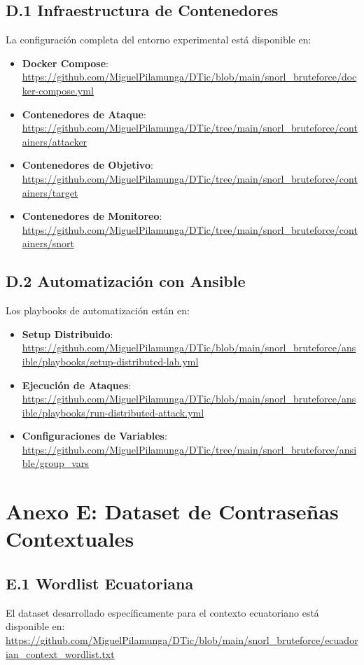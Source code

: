 \subsection*{D.1 Infraestructura de Contenedores}
La configuración completa del entorno experimental está disponible en:
\begin{itemize}
    \item \textbf{Docker Compose}: \url{https://github.com/MiguelPilamunga/DTic/blob/main/snorl_bruteforce/docker-compose.yml}
    \item \textbf{Contenedores de Ataque}: \url{https://github.com/MiguelPilamunga/DTic/tree/main/snorl_bruteforce/containers/attacker}
    \item \textbf{Contenedores de Objetivo}: \url{https://github.com/MiguelPilamunga/DTic/tree/main/snorl_bruteforce/containers/target}
    \item \textbf{Contenedores de Monitoreo}: \url{https://github.com/MiguelPilamunga/DTic/tree/main/snorl_bruteforce/containers/snort}
\end{itemize}

\subsection*{D.2 Automatización con Ansible}
Los playbooks de automatización están en:
\begin{itemize}
    \item \textbf{Setup Distribuido}: \url{https://github.com/MiguelPilamunga/DTic/blob/main/snorl_bruteforce/ansible/playbooks/setup-distributed-lab.yml}
    \item \textbf{Ejecución de Ataques}: \url{https://github.com/MiguelPilamunga/DTic/blob/main/snorl_bruteforce/ansible/playbooks/run-distributed-attack.yml}
    \item \textbf{Configuraciones de Variables}: \url{https://github.com/MiguelPilamunga/DTic/tree/main/snorl_bruteforce/ansible/group_vars}
\end{itemize}

\section*{Anexo E: Dataset de Contraseñas Contextuales}

\subsection*{E.1 Wordlist Ecuatoriana}
El dataset desarrollado específicamente para el contexto ecuatoriano está disponible en:
\url{https://github.com/MiguelPilamunga/DTic/blob/main/snorl_bruteforce/ecuadorian_context_wordlist.txt}

